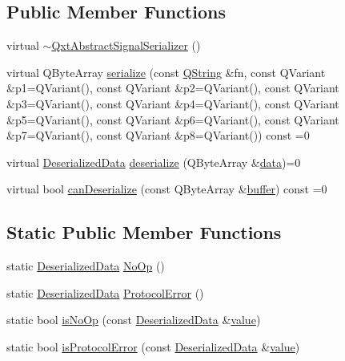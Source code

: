 \subsection*{Public Member Functions}
\begin{DoxyCompactItemize}
\item 
virtual \hyperlink{class_qxt_abstract_signal_serializer_aea95c9475ae88c1b20f64348eadd43ff}{$\sim$\-Qxt\-Abstract\-Signal\-Serializer} ()
\item 
virtual Q\-Byte\-Array \hyperlink{class_qxt_abstract_signal_serializer_a20413abc6a7b0b9046b4101193f8a64f}{serialize} (const \hyperlink{group___u_a_v_objects_plugin_gab9d252f49c333c94a72f97ce3105a32d}{Q\-String} \&fn, const Q\-Variant \&p1=Q\-Variant(), const Q\-Variant \&p2=Q\-Variant(), const Q\-Variant \&p3=Q\-Variant(), const Q\-Variant \&p4=Q\-Variant(), const Q\-Variant \&p5=Q\-Variant(), const Q\-Variant \&p6=Q\-Variant(), const Q\-Variant \&p7=Q\-Variant(), const Q\-Variant \&p8=Q\-Variant()) const =0
\item 
virtual \hyperlink{class_qxt_abstract_signal_serializer_a101019f7e2f0c3267e01c1da89104b40}{Deserialized\-Data} \hyperlink{class_qxt_abstract_signal_serializer_ab5a62cd3fa4bdc5a60e4bb41f743cb97}{deserialize} (Q\-Byte\-Array \&\hyperlink{glext_8h_a8850df0785e6fbcc2351af3b686b8c7a}{data})=0
\item 
virtual bool \hyperlink{class_qxt_abstract_signal_serializer_a585ac8f54a35d8558c19094149c6e835}{can\-Deserialize} (const Q\-Byte\-Array \&\hyperlink{glext_8h_af1b5122dc7bfe0a6319e14419cfe3423}{buffer}) const =0
\end{DoxyCompactItemize}
\subsection*{Static Public Member Functions}
\begin{DoxyCompactItemize}
\item 
static \hyperlink{class_qxt_abstract_signal_serializer_a101019f7e2f0c3267e01c1da89104b40}{Deserialized\-Data} \hyperlink{class_qxt_abstract_signal_serializer_a98f688ca4c642997d2f77f3f4ea1a70c}{No\-Op} ()
\item 
static \hyperlink{class_qxt_abstract_signal_serializer_a101019f7e2f0c3267e01c1da89104b40}{Deserialized\-Data} \hyperlink{class_qxt_abstract_signal_serializer_afa01c378b590f2f45f53ec2cdc0b3838}{Protocol\-Error} ()
\item 
static bool \hyperlink{class_qxt_abstract_signal_serializer_a6cc4b142895f91590a201ebb4bed7a23}{is\-No\-Op} (const \hyperlink{class_qxt_abstract_signal_serializer_a101019f7e2f0c3267e01c1da89104b40}{Deserialized\-Data} \&\hyperlink{glext_8h_aa0e2e9cea7f208d28acda0480144beb0}{value})
\item 
static bool \hyperlink{class_qxt_abstract_signal_serializer_a13df33e37bfea0ba1557a06f06180789}{is\-Protocol\-Error} (const \hyperlink{class_qxt_abstract_signal_serializer_a101019f7e2f0c3267e01c1da89104b40}{Deserialized\-Data} \&\hyperlink{glext_8h_aa0e2e9cea7f208d28acda0480144beb0}{value})
\end{DoxyCompactItemize}


